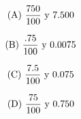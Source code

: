 \documentclass[11pt]{article}
\begin{document}
\begin{multicols}{2}

\begin{equation} \text{(A) \vspace{4mm}} \frac{750}{100} \text{\vspace{20cm} y
\vspace{20cm}} 7.500 \nonumber \end{equation}

\begin{equation} \text{(B) \vspace{4mm}} \frac{.75}{100} \text{\vspace{20cm} y
\vspace{20cm}} 0.0075  \nonumber \end{equation}

\begin{equation} \text{(C) \vspace{4mm}} \frac{7.5}{100} \text{\vspace{20cm} y
\vspace{20cm}} 0.075 \nonumber \end{equation}

\begin{equation} \text{(D) \vspace{4mm}} \frac{75}{100} \text{\vspace{20cm} y
\vspace{20cm}} 0.750 \nonumber \end{equation}

\end{multicols}

\vspace{5mm}
\end{document}
